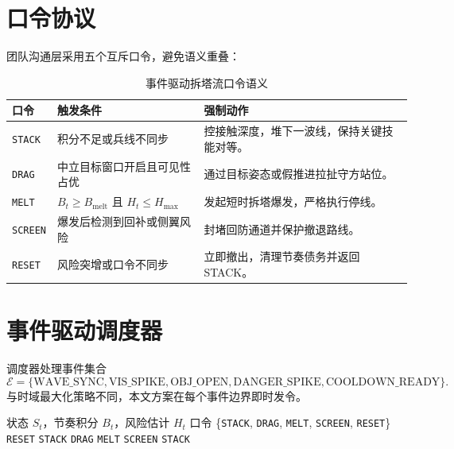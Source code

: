 \documentclass[runningheads]{llncs}
\begin{document}
\section{口令协议}
团队沟通层采用五个互斥口令，避免语义重叠：
\begin{table}[t]
\centering
\caption{事件驱动拆塔流口令语义}
\begin{tabular}{p{1.7cm}p{3.1cm}p{5.6cm}}
\toprule
口令 & 触发条件 & 强制动作 \\
\midrule
\texttt{STACK} & 积分不足或兵线不同步 & 控接触深度，堆下一波线，保持关键技能对等。 \\
\texttt{DRAG} & 中立目标窗口开启且可见性占优 & 通过目标姿态或假推进拉扯守方站位。 \\
\texttt{MELT} & $B_t\!\ge\!B_{\text{melt}}$ 且 $H_t\!\le\!H_{\max}$ & 发起短时拆塔爆发，严格执行停线。 \\
\texttt{SCREEN} & 爆发后检测到回补或侧翼风险 & 封堵回防通道并保护撤退路线。 \\
\texttt{RESET} & 风险突增或口令不同步 & 立即撤出，清理节奏债务并返回 STACK。 \\
\bottomrule
\end{tabular}
\end{table}

\section{事件驱动调度器}
调度器处理事件集合
\[
\mathcal{E}=\{\mathrm{WAVE\_SYNC},\mathrm{VIS\_SPIKE},\mathrm{OBJ\_OPEN},
\mathrm{DANGER\_SPIKE},\mathrm{COOLDOWN\_READY}\}.
\]
与时域最大化策略不同，本文方案在每个事件边界即时发令。

\begin{algorithm}[H]
\caption{拆塔速推事件调度流程}
\begin{algorithmic}[1]
\Require 状态 $S_t$，节奏积分 $B_t$，风险估计 $H_t$
\Ensure 口令 \{\texttt{STACK}, \texttt{DRAG}, \texttt{MELT}, \texttt{SCREEN}, \texttt{RESET}\}
  \State \Return \texttt{RESET}
\EndIf
{}
  \State \Return \texttt{STACK}
\EndIf
{}
  \State \Return \texttt{DRAG}
\EndIf
{}
  \State \Return \texttt{MELT}
\EndIf
{}
  \State \Return \texttt{SCREEN}
\EndIf
\State \Return \texttt{STACK}
\end{algorithmic}
\end{algorithm}
\end{document}

